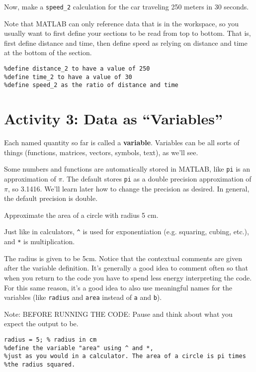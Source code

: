 \documentclass{ximera}
\begin{document}
\begin{example}
Now, make a \texttt{speed\_2} calculation for the car traveling 250 meters in 30 seconds. 

\begin{remark}
Note that MATLAB can only reference data that is in the workspace, so you usually want to first define your sections to be read from top to bottom. That is, first define distance and time, then define speed as relying on distance and time at the bottom of the section.
\end{remark}

\begin{verbatim}
%define distance_2 to have a value of 250
%define time_2 to have a value of 30
%define speed_2 as the ratio of distance and time
\end{verbatim}
\end{example}

\section*{Activity 3: Data as ``Variables''}

Each named quantity so far is called a \textbf{variable}. Variables can be all sorts of things (functions, matrices, vectors, symbols, text), as we'll see.

Some numbers and functions are automatically stored in MATLAB, like \texttt{pi} is an approximation of \(\pi\). The default stores \texttt{pi} as a double precision approximation of \(\pi\), so 3.1416. We'll learn later how to change the precision as desired. In general, the default precision is double.

\begin{example}
Approximate the area of a circle with radius 5 cm. 

Just like in calculators, \texttt{\^} is used for exponentiation (e.g. squaring, cubing, etc.), and \texttt{*} is multiplication.

The radius is given to be 5cm. Notice that the contextual comments are given after the variable definition. It's generally a good idea to comment often so that when you return to the code you have to spend less energy interpreting the code. For this same reason, it's a good idea to also use meaningful names for the variables (like \texttt{radius} and \texttt{area} instead of \texttt{a} and \texttt{b}).

\begin{remark}
Note: BEFORE RUNNING THE CODE: Pause and think about what you expect the output to be.
\end{remark}

\begin{verbatim}
radius = 5; % radius in cm
%define the variable "area" using ^ and *, 
%just as you would in a calculator. The area of a circle is pi times
%the radius squared.
\end{verbatim}
\end{example}
\end{document}
